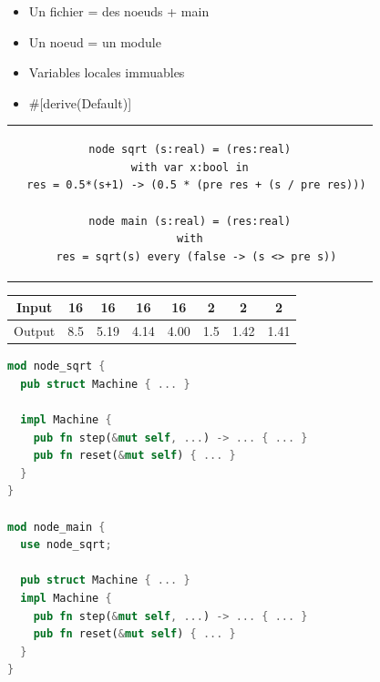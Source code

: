 \documentclass[11pt,usenames,dvipsnames]{beamer}
\newcommand{\inline}[1]{{\ttfamily #1}}
\begin{document}
\begin{frame}[fragile]{\null}
  \begin{itemize}
  \item<1-> Un fichier = des noeuds + \inline{main}
  \item<2-> Un noeud = un module
  \item<3-> Variables locales immuables 
  \item<5-> \inline{\#[derive(Default)]}
  \end{itemize}
\end{frame}

\begin{frame}[fragile]{\null}
  \begin{tabular}{c}
    \begin{lstlisting}[language=minils]
node sqrt (s:real) = (res:real)
with var x:bool in
  res = 0.5*(s+1) -> (0.5 * (pre res + (s / pre res)))

node main (s:real) = (res:real)
with
  res = sqrt(s) every (false -> (s <> pre s))
\end{lstlisting}
  \end{tabular}

  \begin{center}
    \begin{tabular}{|c|ccccccc|}
      \hline
      Input  & 16   & 16   & 16   & 16   & 2   & 2    & 2   \\
      \hline
      Output & 8.5  & 5.19 & 4.14 & 4.00 & 1.5 & 1.42 & 1.41 \\
      \hline
    \end{tabular}
  \end{center}
\end{frame}

\begin{frame}[fragile]{\null}
  \begin{lstlisting}[language=Rust]
mod node_sqrt {
  pub struct Machine { ... }

  impl Machine {
    pub fn step(&mut self, ...) -> ... { ... }
    pub fn reset(&mut self) { ... }
  }
}

mod node_main {
  use node_sqrt;

  pub struct Machine { ... }
  impl Machine {
    pub fn step(&mut self, ...) -> ... { ... }
    pub fn reset(&mut self) { ... }
  }
}
  \end{lstlisting}
\end{frame}
\end{document}
